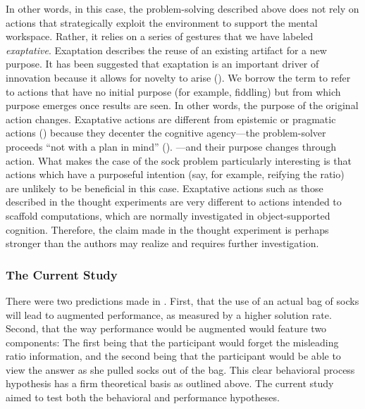 \documentclass[twocolumn, serif, empirical, authordate]{jote-article}
\begin{document}
In other words, in this case, the problem-solving described above does not rely on actions that strategically exploit the environment to support the mental workspace. Rather, it relies on a series of gestures that we have labeled \emph{exaptative}. Exaptation describes the reuse of an existing artifact for a new purpose. It has been suggested that exaptation is an important driver of innovation because it allows for novelty to arise (). We borrow the term to refer to actions that have no initial purpose (for example, fiddling) but from which purpose emerges once results are seen. In other words, the purpose of the original action changes. Exaptative actions are different from epistemic or pragmatic actions () because they decenter the cognitive agency---the problem-solver proceeds ``not with a plan in mind'' (). ---and their purpose changes through action. What makes the case of the sock problem particularly interesting is that actions which have a purposeful intention (say, for example, reifying the ratio) are unlikely to be beneficial in this case. Exaptative actions such as those described in the thought experiments are very different to actions intended to scaffold computations, which are normally investigated in object-supported cognition. Therefore, the claim made in the thought experiment is perhaps stronger than the authors may realize and requires further investigation.


\subsubsection{The Current Study}

There were two predictions made in \textcite{Vallée-Tourangeau2020}.
First, that the use of an actual bag of socks will lead to augmented performance, as measured by a higher solution rate. Second, that the way performance would be augmented would feature two components: The first being that the participant would forget the misleading ratio information, and the second being that the participant would be able to view the answer as she pulled socks out of the bag. This clear behavioral process hypothesis has a firm theoretical basis as outlined above. The current study aimed to test both the behavioral and performance hypotheses.
\end{document}
